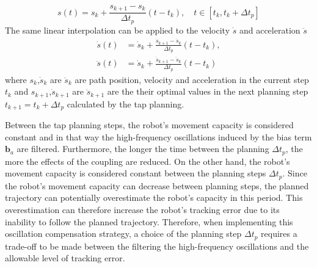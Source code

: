 \begin{equation}
    s(t) = s_k + \frac{s_{k+1}-s_k}{\Delta t_p}(t - t_k), \quad t \in \left[t_k, t_k + \Delta t_p\right]
\end{equation}
The same linear interpolation can be applied to the velocity $\dot{s}$ and acceleration $\ddot{s}$
\begin{equation}
\begin{split}
    \dot{s}(t) &= \dot{s}_k + \frac{\dot{s}_{k+1} - \dot{s}_{k}}{\Delta t_p}(t - t_k),\\
    \ddot{s}(t) &= \dot{s}_k + \frac{\ddot{s}_{k+1} - \ddot{s}_{k}}{\Delta t_p}(t - t_k)
\end{split}
\end{equation}
where $s_k$,$\dot{s}_k$ are $\ddot{s}_k$ are path position, velocity and acceleration in the current step $t_k$ and  $s_{k+1}$,$\dot{s}_{k+1}$ are $\ddot{s}_{k+1}$ are the their optimal values in the next planning step $t_{k+1}=t_k + \Delta t_p$ calculated by the \gls{tap} planning. 

Between the \gls{tap} planning steps, the robot's movement capacity is considered constant and in that way the high-frequency oscillations induced by the bias term $\bm{b}_a$ are filtered. Furthermore, the longer the time between the planning $\Delta t_p$, the more the effects of the coupling are reduced. On the other hand, the robot's movement capacity is considered constant between the planning steps $\Delta t_p$. Since the robot's movement capacity can decrease between planning steps, the planned trajectory can potentially overestimate the robot's capacity in this period. This overestimation can therefore increase the robot's tracking error due to its inability to follow the planned trajectory.
Therefore, when implementing this oscillation compensation strategy, a choice of the planning step $\Delta t_p$ requires a trade-off to be made between the filtering the high-frequency oscillations and the allowable level of tracking error. 
 







